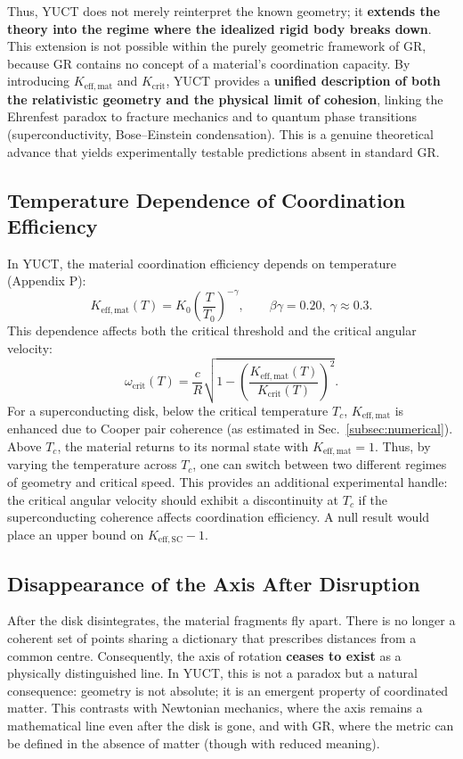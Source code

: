\documentclass[12pt,a4paper]{article}
\newcommand{\Keffmat}{K_{\mathrm{eff,mat}}}
\newcommand{\Kcrit}{K_{\mathrm{crit}}}
\begin{document}
	Thus, YUCT does not merely reinterpret the known geometry; it \textbf{extends the theory into the regime where the idealized rigid body breaks down}. This extension is not possible within the purely geometric framework of GR, because GR contains no concept of a material’s coordination capacity. By introducing \(\Keffmat\) and \(\Kcrit\), YUCT provides a \textbf{unified description of both the relativistic geometry and the physical limit of cohesion}, linking the Ehrenfest paradox to fracture mechanics and to quantum phase transitions (superconductivity, Bose–Einstein condensation). This is a genuine theoretical advance that yields experimentally testable predictions absent in standard GR.
	
	\subsection{Temperature Dependence of Coordination Efficiency}
	
	In YUCT, the material coordination efficiency depends on temperature (Appendix P):
	\[
	K_{\mathrm{eff,mat}}(T) = K_0 \left( \frac{T}{T_0} \right)^{-\gamma}, \qquad \beta\gamma = 0.20,\ \gamma \approx 0.3.
	\]
	This dependence affects both the critical threshold and the critical angular velocity:
	\[
	\omega_{\text{crit}}(T) = \frac{c}{R} \sqrt{1 - \left( \frac{K_{\mathrm{eff,mat}}(T)}{K_{\mathrm{crit}}(T)} \right)^2 }.
	\]
	For a superconducting disk, below the critical temperature \(T_c\), \(K_{\mathrm{eff,mat}}\) is enhanced due to Cooper pair coherence (as estimated in Sec.~\ref{subsec:numerical}). Above \(T_c\), the material returns to its normal state with \(K_{\mathrm{eff,mat}} = 1\). Thus, by varying the temperature across \(T_c\), one can switch between two different regimes of geometry and critical speed. This provides an additional experimental handle: the critical angular velocity should exhibit a discontinuity at \(T_c\) if the superconducting coherence affects coordination efficiency. A null result would place an upper bound on \(K_{\mathrm{eff,SC}} - 1\).
	
	\subsection{Disappearance of the Axis After Disruption}
	
	After the disk disintegrates, the material fragments fly apart. There is no longer a coherent set of points sharing a dictionary that prescribes distances from a common centre. Consequently, the axis of rotation \textbf{ceases to exist} as a physically distinguished line. In YUCT, this is not a paradox but a natural consequence: geometry is not absolute; it is an emergent property of coordinated matter. This contrasts with Newtonian mechanics, where the axis remains a mathematical line even after the disk is gone, and with GR, where the metric can be defined in the absence of matter (though with reduced meaning).
	
\end{document}
